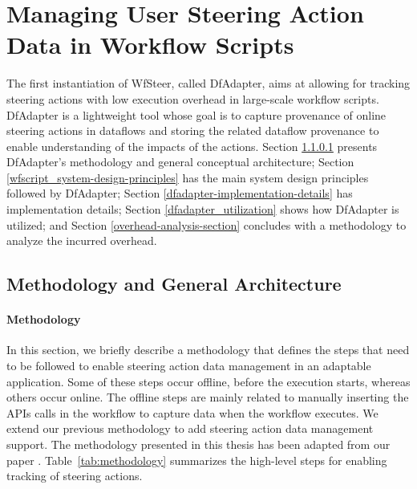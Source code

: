 \chapter{Managing User Steering Action Data in Workflow Scripts}
\label{chap_dfadapter}

The first instantiation of WfSteer, called DfAdapter,
aims at allowing for tracking steering actions with low execution overhead in large-scale workflow scripts.
DfAdapter is a lightweight
tool whose goal is to capture provenance of online steering actions in dataflows and storing the related dataflow provenance to enable understanding of the impacts of the actions.
Section \ref{dfadapter_utilization_methodology} presents DfAdapter's methodology and general conceptual architecture; Section \ref{wfscript_system-design-principles} has the main system design principles followed by DfAdapter; Section \ref{dfadapter-implementation-details} has implementation details; Section \ref{dfadapter_utilization} shows how DfAdapter is utilized; and Section \ref{overhead-analysis-section}
concludes with a methodology to analyze
the incurred overhead.


\section{Methodology and General Architecture}

\subsubsection{Methodology}
\label{dfadapter_utilization_methodology}

In this section, we briefly describe a methodology that defines the  steps that need to be followed to enable steering action data management in an adaptable application.
Some of these steps occur offline, before the execution starts, whereas others occur online.
The offline steps are mainly related to manually inserting the APIs calls in the workflow to capture data when the workflow executes.
We extend our previous methodology \cite{Silva2018Capturing} to add steering action data management support. The methodology
presented in this thesis has been adapted from our paper \citet{souza_keeping_2019}.
Table~\ref{tab:methodology}
summarizes the high-level steps for enabling tracking of steering actions.

